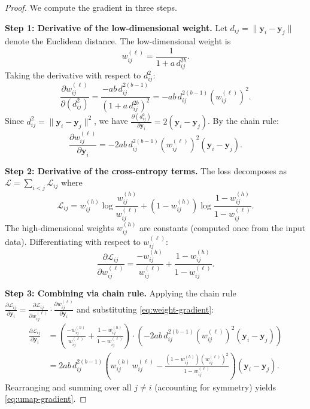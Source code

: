 \begin{proof}
  We compute the gradient in three steps.

  \textbf{Step 1: Derivative of the low-dimensional weight.}
  Let $d_{ij} = \|\mathbf{y}_i - \mathbf{y}_j\|$ denote the Euclidean distance. The low-dimensional weight is
  \[
    w_{ij}^{(\ell)} = \frac{1}{1 + a \, d_{ij}^{2b}}.
  \]
  Taking the derivative with respect to $d_{ij}^2$:
  \[
    \frac{\partial w_{ij}^{(\ell)}}{\partial (d_{ij}^2)} = \frac{-ab \, d_{ij}^{2(b-1)}}{(1 + a \, d_{ij}^{2b})^2} = -ab \, d_{ij}^{2(b-1)} \left(w_{ij}^{(\ell)}\right)^2.
  \]
  Since $d_{ij}^2 = \|\mathbf{y}_i - \mathbf{y}_j\|^2$, we have $\frac{\partial (d_{ij}^2)}{\partial \mathbf{y}_i} = 2(\mathbf{y}_i - \mathbf{y}_j)$. By the chain rule:
  \begin{equation}\label{eq:weight-gradient}
    \frac{\partial w_{ij}^{(\ell)}}{\partial \mathbf{y}_i} = -2ab \, d_{ij}^{2(b-1)} \left(w_{ij}^{(\ell)}\right)^2 (\mathbf{y}_i - \mathbf{y}_j).
  \end{equation}

  \textbf{Step 2: Derivative of the cross-entropy terms.}
  The loss decomposes as $\mathcal{L} = \sum_{i < j} \mathcal{L}_{ij}$ where
  \[
    \mathcal{L}_{ij} = w_{ij}^{(h)} \log\frac{w_{ij}^{(h)}}{w_{ij}^{(\ell)}} + (1 - w_{ij}^{(h)}) \log\frac{1 - w_{ij}^{(h)}}{1 - w_{ij}^{(\ell)}}.
  \]
  The high-dimensional weights $w_{ij}^{(h)}$ are constants (computed once from the input data). Differentiating with respect to $w_{ij}^{(\ell)}$:
  \[
    \frac{\partial \mathcal{L}_{ij}}{\partial w_{ij}^{(\ell)}} = \frac{-w_{ij}^{(h)}}{w_{ij}^{(\ell)}} + \frac{1 - w_{ij}^{(h)}}{1 - w_{ij}^{(\ell)}}.
  \]

  \textbf{Step 3: Combining via chain rule.}
  Applying the chain rule $\frac{\partial \mathcal{L}_{ij}}{\partial \mathbf{y}_i} = \frac{\partial \mathcal{L}_{ij}}{\partial w_{ij}^{(\ell)}} \cdot \frac{\partial w_{ij}^{(\ell)}}{\partial \mathbf{y}_i}$ and substituting \eqref{eq:weight-gradient}:
  \begin{align*}
    \frac{\partial \mathcal{L}_{ij}}{\partial \mathbf{y}_i}
     & = \left( \frac{-w_{ij}^{(h)}}{w_{ij}^{(\ell)}} + \frac{1 - w_{ij}^{(h)}}{1 - w_{ij}^{(\ell)}} \right) \cdot \left( -2ab \, d_{ij}^{2(b-1)} \left(w_{ij}^{(\ell)}\right)^2 (\mathbf{y}_i - \mathbf{y}_j) \right) \\
     & = 2ab \, d_{ij}^{2(b-1)} \left( w_{ij}^{(h)} \, w_{ij}^{(\ell)} - \frac{(1 - w_{ij}^{(h)}) \left(w_{ij}^{(\ell)}\right)^2}{1 - w_{ij}^{(\ell)}} \right) (\mathbf{y}_i - \mathbf{y}_j).
  \end{align*}
  Rearranging and summing over all $j \neq i$ (accounting for symmetry) yields \eqref{eq:umap-gradient}.
\end{proof}

